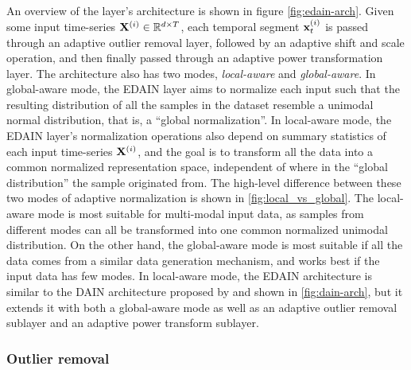 \documentclass{statsmsc}
\begin{document}
{An overview of the layer's architecture is shown in figure \cref{fig:edain-arch}.
Given some input time-series $\mathbf{X}^{(i)} \in \mathbb{R}^{d \times T}$, each temporal segment
$\mathbf{x}^{(i)}_t$ is passed through an adaptive outlier removal layer, followed by an adaptive shift
and scale operation, and then finally passed through an adaptive power transformation layer.
The architecture also has two modes, \textit{local-aware} and \textit{global-aware}. In
global-aware mode, the \ac{EDAIN} layer aims to normalize each input such that the resulting
distribution of all the samples in the dataset resemble a unimodal normal distribution, that is,
a ``global normalization''. In local-aware mode,
the \ac{EDAIN} layer's normalization operations
also depend on summary statistics of each input time-series $\mathbf{X}^{(i)}$, and the goal is to transform
all the data into a common normalized representation space, independent of where in the
``global distribution'' the sample originated from. The high-level difference between these two
modes of adaptive normalization is shown in \cref{fig:local_vs_global}.
The local-aware mode is most suitable for
multi-modal input data, as samples from different modes can all be transformed into one common
normalized unimodal distribution. On the other hand, the global-aware mode
is most suitable if all the data comes from a similar data generation mechanism,
and works best if the input data has few modes.
In local-aware mode, the \ac{EDAIN} architecture is similar to the
\ac{DAIN} architecture proposed by \cite{dain} and shown
in \cref{fig:dain-arch}, but it
extends it with both a global-aware mode as well as an adaptive outlier removal sublayer and
an adaptive power transform sublayer.

\subsubsection{Outlier removal}%
\label{ssub:Outlier removal}

}
\end{document}
